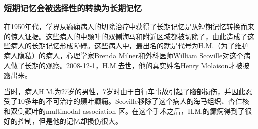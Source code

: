 \documentclass[UTF8,nofonts]{ctexart}
\begin{document}
\subsubsection{短期记忆会被选择性的转换为长期记忆}
在1950年代，学界从癫痫病人的切除治疗中获得了长期记忆是从短期记忆转换而来的惊人证据。这些病人的中颞叶的双侧海马和附近区域都被切除了，由此造成了这些病人的长期记忆形成障碍。这些病人中，最出名的就是代号为H.M.（为了维护病人隐私）的病人，心理学家Brenda Milner和外科医师William Scoville对这个病人做了长期的观察。2008-12-1，H.M.去世，他的真实姓名Henry Molaison才被披露出来。
\par
当时，病人H.M.为27岁的男性，7岁时由于自行车事故引起了脑部损伤，并因此忍受了10多年的不可治疗的颞叶癫痫。Scoville移除了这个病人的海马组织、杏仁核和双侧颞叶的multimodal association 区。在这个手术之后，H.M.的癫痫得到了很好的控制，但是他的记忆却损伤很大。
\par
\end{document}
